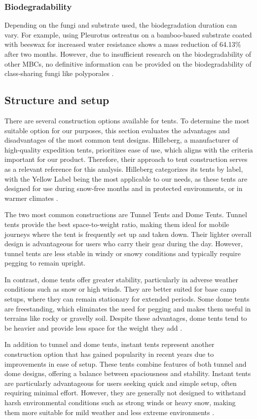 \documentclass{article}
\begin{document}
\subsubsection{Biodegradability}
Depending on the fungi and substrate used, the biodegradation duration can vary.
For example, using Pleurotus ostreatus on a bamboo-based substrate coated with beeswax
for increased water resistance shows a mass reduction of 64.13\% after two months. However,
due to insufficient research on the biodegradability of other MBCs, no definitive
information can be provided on the biodegradability of class-sharing fungi like
polyporales \parencite{gan}. 

\subsection{Structure and setup}
There are several construction options available for tents. To determine the most suitable
option for our purposes, this section evaluates the advantages and disadvantages of the
most common tent designs. Hilleberg, a manufacturer of high-quality expedition tents,
prioritizes ease of use, which aligns with the criteria important for our product. Therefore,
their approach to tent construction serves as a relevant reference for this analysis.
Hilleberg categorizes its tents by label, with the Yellow Label being the most applicable
to our needs, as these tents are designed for use during snow-free months and in
protected environments, or in warmer climates \parencite{hilleberg2024b}.

The two most common constructions are Tunnel Tents and Dome Tents. Tunnel tents
provide the best space-to-weight ratio, making them ideal for mobile journeys where the
tent is frequently set up and taken down. Their lighter overall design is advantageous for
users who carry their gear during the day. However, tunnel tents are less stable in windy
or snowy conditions and typically require pegging to remain upright.

In contrast, dome tents offer greater stability, particularly in adverse weather conditions
such as snow or high winds. They are better suited for base camp setups, where they can
remain stationary for extended periods. Some dome tents are freestanding, which
eliminates the need for pegging and makes them useful in terrains like rocky or gravelly
soil. Despite these advantages, dome tents tend to be heavier and provide less space for
the weight they add \parencite{hilleberg2024a}. 

In addition to tunnel and dome tents, instant tents represent another construction option
that has gained popularity in recent years due to improvements in ease of setup. These
tents combine features of both tunnel and dome designs, offering a balance between
spaciousness and stability. Instant tents are particularly advantageous for users seeking
quick and simple setup, often requiring minimal effort. However, they are generally not
designed to withstand harsh environmental conditions such as strong winds or heavy
snow, making them more suitable for mild weather and less extreme environments
\parencite{outdoorlife2024}.
\end{document}
